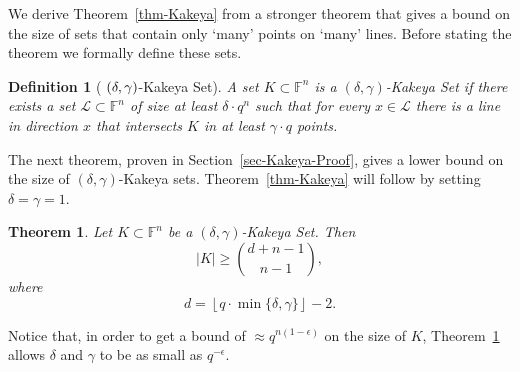 \documentclass[12pt]{article}
\newtheorem{define}[thm]{Definition}
\newtheorem{THM}{Theorem}
\def\F{{\mathbb{F}}}
\def\cL{{\mathcal L}}
\newcommand{\eps}{\epsilon}
\begin{document}
We derive Theorem~\ref{thm-Kakeya} from a stronger theorem that
gives a bound on the size of sets that contain only `many' points
on `many' lines. Before stating the theorem we formally define
these sets.
\begin{define}[ $\bf{ (\delta,\gamma)}$-Kakeya
Set] A set $K \subset \F^n$ is a $(\delta,\gamma)$-{\sf Kakeya
Set} if there exists a set $\cL \subset \F^n$ of size at least
$\delta \cdot q^n$ such that for every $x \in \cL$ there is a line
in direction $x$ that intersects $K$ in at least $\gamma \cdot q$
points.
\end{define}
The next theorem, proven in Section~\ref{sec-Kakeya-Proof}, gives
a lower bound on the size of $(\delta,\gamma)$-Kakeya sets.
Theorem~\ref{thm-Kakeya} will follow by setting $\delta=\gamma=1$.
\begin{THM}\label{thm-Kakeya-Strong}
Let $K \subset \F^n$ be a $(\delta,\gamma)$-Kakeya Set. Then
\[ |K| \geq { d + n-1 \choose n-1 }, \]
where $$d = \left\lfloor q \cdot \min\{ \delta , \gamma \}
\right\rfloor - 2.$$
\end{THM}
Notice that, in order to get a bound of $\approx q^{n(1-\eps)}$ on
the size of $K$, Theorem~\ref{thm-Kakeya-Strong} allows $\delta$
and $\gamma$ to be as small as $q^{-\eps}$.
\end{document}
